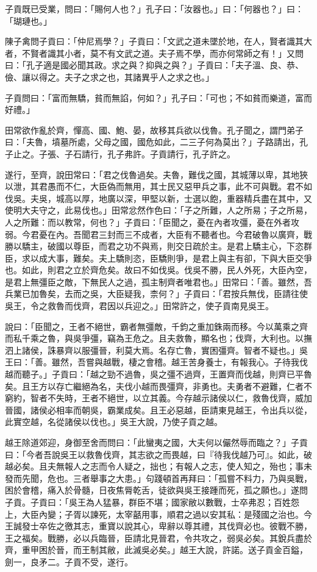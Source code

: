 \begin{pinyinscope}
子貢既已受業，問曰：「賜何人也？」孔子曰：「汝器也。」曰：「何器也？」曰：「瑚璉也。」

陳子禽問子貢曰：「仲尼焉學？」子貢曰：「文武之道未墜於地，在人，賢者識其大者，不賢者識其小者，莫不有文武之道。夫子焉不學，而亦何常師之有！」又問曰：「孔子適是國必聞其政。求之與？抑與之與？」子貢曰：「夫子溫、良、恭、儉、讓以得之。夫子之求之也，其諸異乎人之求之也。」

子貢問曰：「富而無驕，貧而無諂，何如？」孔子曰：「可也；不如貧而樂道，富而好禮。」

田常欲作亂於齊，憚高、國、鮑、晏，故移其兵欲以伐魯。孔子聞之，謂門弟子曰：「夫魯，墳墓所處，父母之國，國危如此，二三子何為莫出？」子路請出，孔子止之。子張、子石請行，孔子弗許。子貢請行，孔子許之。

遂行，至齊，說田常曰：「君之伐魯過矣。夫魯，難伐之國，其城薄以卑，其地狹以泄，其君愚而不仁，大臣偽而無用，其士民又惡甲兵之事，此不可與戰。君不如伐吳。夫吳，城高以厚，地廣以深，甲堅以新，士選以飽，重器精兵盡在其中，又使明大夫守之，此易伐也。」田常忿然作色曰：「子之所難，人之所易；子之所易，人之所難：而以教常，何也？」子貢曰：「臣聞之，憂在內者攻彊，憂在外者攻弱。今君憂在內。吾聞君三封而三不成者，大臣有不聽者也。今君破魯以廣齊，戰勝以驕主，破國以尊臣，而君之功不與焉，則交日疏於主。是君上驕主心，下恣群臣，求以成大事，難矣。夫上驕則恣，臣驕則爭，是君上與主有卻，下與大臣交爭也。如此，則君之立於齊危矣。故曰不如伐吳。伐吳不勝，民人外死，大臣內空，是君上無彊臣之敵，下無民人之過，孤主制齊者唯君也。」田常曰：「善。雖然，吾兵業已加魯矣，去而之吳，大臣疑我，柰何？」子貢曰：「君按兵無伐，臣請往使吳王，令之救魯而伐齊，君因以兵迎之。」田常許之，使子貢南見吳王。

說曰：「臣聞之，王者不絕世，霸者無彊敵，千鈞之重加銖兩而移。今以萬乘之齊而私千乘之魯，與吳爭彊，竊為王危之。且夫救魯，顯名也；伐齊，大利也。以撫泗上諸侯，誅暴齊以服彊晉，利莫大焉。名存亡魯，實困彊齊。智者不疑也。」吳王曰：「善。雖然，吾嘗與越戰，棲之會稽。越王苦身養士，有報我心。子待我伐越而聽子。」子貢曰：「越之勁不過魯，吳之彊不過齊，王置齊而伐越，則齊已平魯矣。且王方以存亡繼絕為名，夫伐小越而畏彊齊，非勇也。夫勇者不避難，仁者不窮約，智者不失時，王者不絕世，以立其義。今存越示諸侯以仁，救魯伐齊，威加晉國，諸侯必相率而朝吳，霸業成矣。且王必惡越，臣請東見越王，令出兵以從，此實空越，名從諸侯以伐也。」吳王大說，乃使子貢之越。

越王除道郊迎，身御至舍而問曰：「此蠻夷之國，大夫何以儼然辱而臨之？」子貢曰：「今者吾說吳王以救魯伐齊，其志欲之而畏越，曰『待我伐越乃可』。如此，破越必矣。且夫無報人之志而令人疑之，拙也；有報人之志，使人知之，殆也；事未發而先聞，危也。三者舉事之大患。」句踐頓首再拜曰：「孤嘗不料力，乃與吳戰，困於會稽，痛入於骨髓，日夜焦脣乾舌，徒欲與吳王接踵而死，孤之願也。」遂問子貢。子貢曰：「吳王為人猛暴，群臣不堪；國家敝以數戰，士卒弗忍；百姓怨上，大臣內變；子胥以諫死，太宰嚭用事，順君之過以安其私：是殘國之治也。今王誠發士卒佐之徼其志，重寶以說其心，卑辭以尊其禮，其伐齊必也。彼戰不勝，王之福矣。戰勝，必以兵臨晉，臣請北見晉君，令共攻之，弱吳必矣。其銳兵盡於齊，重甲困於晉，而王制其敝，此滅吳必矣。」越王大說，許諾。送子貢金百鎰，劍一，良矛二。子貢不受，遂行。


\end{pinyinscope}
